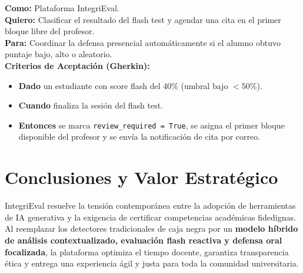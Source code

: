 \documentclass[11pt,a4paper]{article}
\begin{document}
\begin{tcolorbox}[title=US-10: Ruteo Inteligente y Agendamiento Automático de Citas (Épica 6 — 5 SP)]
\textbf{Como:} Plataforma IntegriEval.\\
\textbf{Quiero:} Clasificar el resultado del flash test y agendar una cita en el primer bloque libre del profesor.\\
\textbf{Para:} Coordinar la defensa presencial automáticamente si el alumno obtuvo puntaje bajo, alto o aleatorio.\\
\textbf{Criterios de Aceptación (Gherkin):}
\begin{itemize}
    \item \textbf{Dado} un estudiante con score flash del 40\% (umbral bajo $< 50\%$).
    \item \textbf{Cuando} finaliza la sesión del flash test.
    \item \textbf{Entonces} se marca \texttt{review\_required = True}, se asigna el primer bloque disponible del profesor y se envía la notificación de cita por correo.
\end{itemize}
\end{tcolorbox}

\newpage

\section{Conclusiones y Valor Estratégico}
IntegriEval resuelve la tensión contemporánea entre la adopción de herramientas de IA generativa y la exigencia de certificar competencias académicas fidedignas. Al reemplazar los detectores tradicionales de caja negra por un \textbf{modelo híbrido de análisis contextualizado, evaluación flash reactiva y defensa oral focalizada}, la plataforma optimiza el tiempo docente, garantiza transparencia ética y entrega una experiencia ágil y justa para toda la comunidad universitaria.
\end{document}

